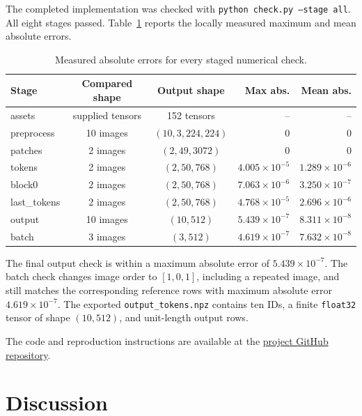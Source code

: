 \documentclass[a4paper,12pt]{article}
\begin{document}
The completed implementation was checked with
\texttt{python check.py --stage all}. All eight stages passed. Table~\ref{tab:results}
reports the locally measured maximum and mean absolute errors.

\begin{table}[H]
\centering
\small
\setlength{\tabcolsep}{4pt}
\renewcommand{\arraystretch}{1.05}
\begin{tabular}{@{}lccrr@{}}
\toprule
Stage & Compared shape & Output shape & Max abs. & Mean abs. \\
\midrule
assets & supplied tensors & 152 tensors & -- & -- \\
preprocess & 10 images & \((10,3,224,224)\) & \(0\) & \(0\) \\
patches & 2 images & \((2,49,3072)\) & \(0\) & \(0\) \\
tokens & 2 images & \((2,50,768)\) & \(4.005\times10^{-5}\) & \(1.289\times10^{-6}\) \\
block0 & 2 images & \((2,50,768)\) & \(7.063\times10^{-6}\) & \(3.250\times10^{-7}\) \\
last\_tokens & 2 images & \((2,50,768)\) & \(4.768\times10^{-5}\) & \(2.696\times10^{-6}\) \\
output & 10 images & \((10,512)\) & \(5.439\times10^{-7}\) & \(8.311\times10^{-8}\) \\
batch & 3 images & \((3,512)\) & \(4.619\times10^{-7}\) & \(7.632\times10^{-8}\) \\
\bottomrule
\end{tabular}
\caption{Measured absolute errors for every staged numerical check.}
\label{tab:results}
\end{table}

The final output check is within a maximum absolute error of
\(5.439\times10^{-7}\). The batch check changes image order to
\([1,0,1]\), including a repeated image, and still matches the corresponding
reference rows with maximum absolute error \(4.619\times10^{-7}\). The exported
\texttt{output\_tokens.npz} contains ten IDs, a finite
\texttt{float32} tensor of shape \((10,512)\), and unit-length output rows.

The code and reproduction instructions are available at the
\href{https://github.com/Luo-start/project1-numpy-student}
{project GitHub repository}.

\section{Discussion}
\end{document}
